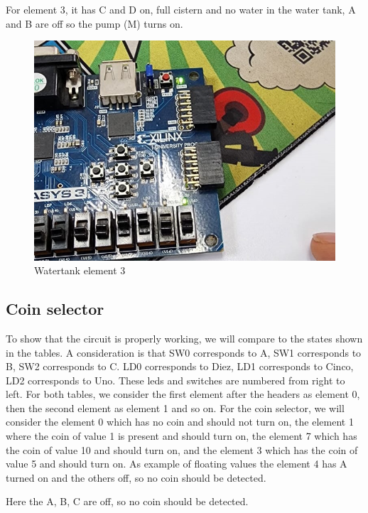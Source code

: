 \documentclass{article}
\begin{document}
\begin{multicols}{2}
	For element 3, it has C and D on, full cistern and no water in the water tank, A and B are off so the pump (M) turns on.

	\begin{figure}[H]
		\centering
		\includegraphics[width=0.8\linewidth]{images/diagrams/watertank/watertank3.jpg}
		\caption{Watertank element 3}
		\label{Watertank element 3}
	\end{figure}

	\subsection*{Coin selector}\label{Coin selector Records}

	To show that the circuit is properly working, we will compare to the states shown in the tables. A consideration is that SW0 corresponds to A, SW1 corresponds to B, SW2 corresponds to C. LD0 corresponds to Diez, LD1 corresponds to Cinco, LD2 corresponds to Uno. These leds and switches are numbered from right to left. For both tables, we consider the first element after the headers as element 0, then the second element as element 1 and so on. For the coin selector, we will consider the element 0 which has no coin and should not turn on, the element 1 where the coin of value 1 is present and should turn on, the element 7 which has the coin of value 10 and should turn on, and the element 3 which has the coin of value 5 and should turn on. As example of floating values the element 4 has A turned on and the others off, so no coin should be detected.

	Here the A, B, C are off, so no coin should be detected.


\end{multicols}
\end{document}
